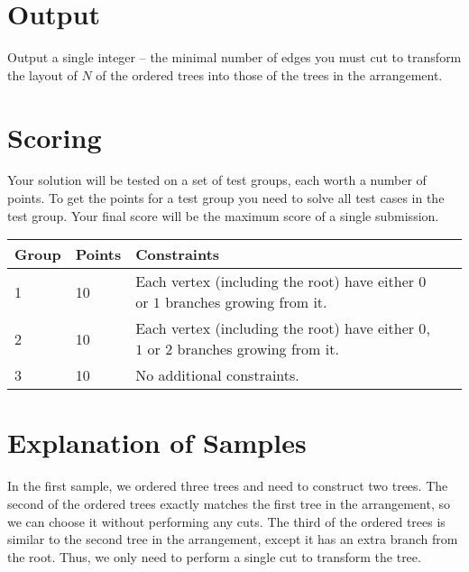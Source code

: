 \section*{Output}
Output a single integer -- the minimal number of edges you must cut to transform the layout of $N$ of the ordered trees into those of the trees in the arrangement.

\section*{Scoring}
Your solution will be tested on a set of test groups, each worth a number of points.
To get the points for a test group you need to solve all test cases in the test group.
Your final score will be the maximum score of a single submission.

\noindent
\begin{tabular}{| l | l | l | l |}
\hline
Group & Points & Constraints \\ \hline
1     & 10     & Each vertex (including the root) have either $0$ or $1$ branches growing from it.  \\ \hline
2     & 10     & Each vertex (including the root) have either $0$, $1$ or $2$ branches growing from it.  \\ \hline
3     & 10     & No additional constraints. \\ \hline
\end{tabular}

\section*{Explanation of Samples}
In the first sample, we ordered three trees and need to construct two trees.
The second of the ordered trees exactly matches the first tree in the arrangement, so we can choose it without performing any cuts.
The third of the ordered trees is similar to the second tree in the arrangement, except it has an extra branch from the root.
Thus, we only need to perform a single cut to transform the tree.
